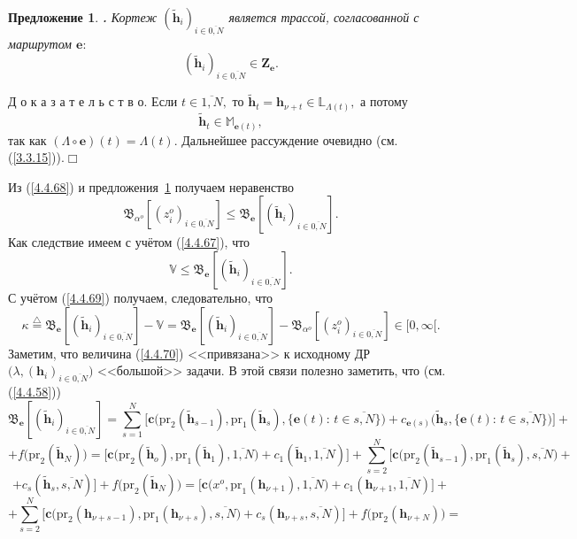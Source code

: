 \documentclass[12pt,twoside]{report}
\newcommand{\bfn}{\begin{equation}}
\newcommand{\efn}{\end{equation}}
\newcommand{\df}{\stackrel{\triangle}{=}}
\newcommand{\ov}{\overline}
\newcounter{theo}
\newcounter{pred}
\newtheorem{pred}{Предложение}[section]
\newcommand{\TL}{\mbox{\bf{$\!\!$.}}}
\newcommand{\La}{\Lambda}
\newcommand{\la}{\lambda}
\newcommand{\al}{\alpha}
\newcommand{\bbl}{{\mathbb L}}
\newcommand{\bbm}{{\mathbb M}}
\begin{document}
{\begin{pred}\label{p4.4.5}{\TL} Кортеж $(\tilde{\mathbf{h}}_i)_{i\in\ov{0,N}}$
является трассой, согласованной с маршрутом $\mathbf{e}:$
$$
(\tilde{\mathbf{h}}_i)_{i\in\ov{0,N}}\in \mathbf{Z}_\mathbf{e}.
$$
\end{pred}

Д о к а з а т е л ь с т в о. Если $t\in \ov{1,N},$ то $\tilde{\mathbf{h}}_t =
\mathbf{h}_{\nu +t}\in \bbl_{\La(t)},$ а потому
$$
\tilde{\mathbf{h}}_t \in \bbm_{\mathbf{e}(t)},
$$
так как $(\La \circ \mathbf{e})(t) = \La(t).$ Дальнейшее рассуждение очевидно
(см. (\ref{3.3.15})).\hfill $\Box$ \smallskip

Из (\ref{4.4.68}) и предложения~{\ref{p4.4.5} получаем неравенство
$$
\mathfrak{B}_{\al^o}[(z_i^o)_{i\in\ov{0,N}}]\leqslant
\mathfrak{B}_\mathbf{e}[(\tilde{\mathbf{h}}_i)_{i\in\ov{0,N}}].
$$
Как следствие имеем с учётом (\ref{4.4.67}), что
\bfn\label{4.4.69}
\mathbb{V} \leqslant \mathfrak{B}_\mathbf{e}[(\tilde{\mathbf{h}}_i)_{i\in\ov{0,N}}].
\efn
С учётом (\ref{4.4.69}) получаем, следовательно, что
\bfn\label{4.4.70}
\kappa \df \mathfrak{B}_\mathbf{e}[(\tilde{\mathbf{h}}_i)_{i\in\ov{0,N}}] -
\mathbb{V} = \mathfrak{B}_\mathbf{e}[(\tilde{\mathbf{h}}_i)_{i\in\ov{0,N}}]-
\mathfrak{B}_{\al^o}[(z_i^o)_{i\in\ov{0,N}}]\in [0,\infty[.
\efn
Заметим, что величина (\ref{4.4.70}) <<привязана>> к исходному ДР $\bigl(\la,(\mathbf{h}_i)_{i\in\ov{0,N}}\bigl)$ <<большой>> задачи. В этой связи полезно заметить, что (см. (\ref{4.4.58}))
$$
\mathfrak{B}_\mathbf{e}[(\tilde{\mathbf{h}}_i)_{i\in\ov{0,N}}]=
\sum\limits_{s=1}^N\bigl[\mathbf{c}\bigl(\mathrm{pr}_2(\tilde{\mathbf{h}}_{s-1}),\mathrm{pr}_1
(\tilde{\mathbf{h}}_s),\{\mathbf{e}(t):\,t\in\ov{s,N}\}\bigl) +
c_{\mathbf{e}(s)}\bigl(\tilde{\mathbf{h}}_s,\{\mathbf{e}(t):\,t\in\ov{s,N}\}\bigl)\bigl] +
$$
$$
+ f\bigl(\mathrm{pr}_2(\tilde{\mathbf{h}}_N)\bigl) = \bigl[\mathbf{c}\bigl(\mathrm{pr}_2
(\tilde{\mathbf{h}}_o),\mathrm{pr}_1(\tilde{\mathbf{h}}_1),\ov{1,N}) +
c_1(\tilde{\mathbf{h}}_1,\ov{1,N})\bigl] +
\sum\limits_{s=2}^N\bigl[\mathbf{c}\bigl(\mathrm{pr}_2(\tilde{\mathbf{h}}_{s-1}),
\mathrm{pr}_1(\tilde{\mathbf{h}}_s),\ov{s,N}\bigl) +
$$
$$
+ c_s(\tilde{\mathbf{h}}_s,\ov{s,N})\bigl] +
f\bigl(\mathrm{pr}_2(\tilde{\mathbf{h}}_N)\bigl) =
\bigl[\mathbf{c}\bigl(x^o,\mathrm{pr}_1(\mathbf{h}_{\nu+1}),\ov{1,N}\bigl) +
c_1(\mathbf{h}_{\nu+1},\ov{1,N})\bigl] + $$
$$+ \sum\limits_{s=2}^N\bigl[\mathbf{c}\bigl(\mathrm{pr}_2(\mathbf{h}_{\nu+s-1}),
\mathrm{pr}_1(\mathbf{h}_{\nu+s}),\ov{s,N}\bigl) + c_s(\mathbf{h}_{\nu+s},\ov{s,N})\bigl] +
f\bigl(\mathrm{pr}_2(\mathbf{h}_{\nu+N})\bigl) =
$$}}
\end{document}
